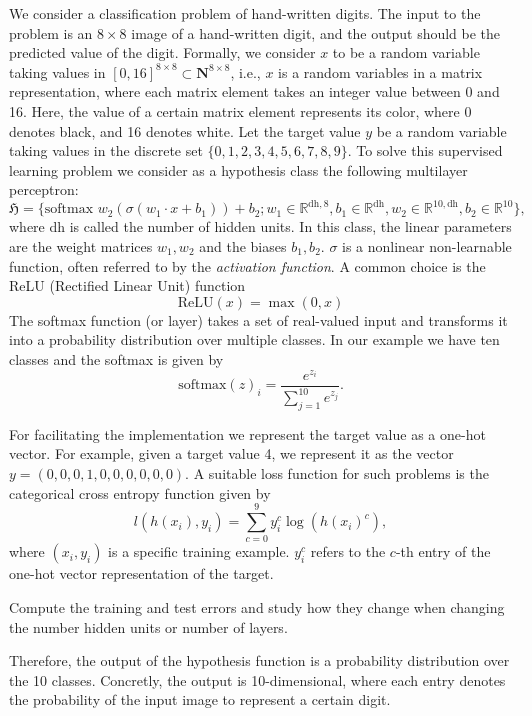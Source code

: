 \begin{boxedexample}[Classification] \complementary{\theexample}
    \label{ex:classification}
    We consider a classification problem of hand-written digits. The input to
    the problem is an $8 \times 8$ image of a hand-written digit, and the output
    should be the predicted value of the digit. Formally, we consider $x$ to be a
    random variable taking values in $[0, 16]^{8 \times 8} \subset
    \mathbf{N}^{8 \times 8}$, i.e., $x$ is a random variables in a matrix
    representation, where each matrix element takes an integer value between 0
    and 16. Here, the value of a certain matrix element represents its color,
    where 0 denotes black, and 16 denotes white. Let the target value $y$ be a
    random variable taking values in the discrete set $\{0,1,2,3,4,5,6,7,8,9\}$.
    To solve this supervised learning problem we consider as a hypothesis class
    the following multilayer perceptron:
    \begin{equation*}
        \mathfrak{H} = \bigl\{\text{softmax } w_2 \left(\sigma (w_1 \cdot x + b_1 ) \right) + b_2 ; w_1 \in \mathbb{R}^{\text{dh}, 8}, b_1 \in \mathbb{R}^{\text{dh}}, w_2 \in \mathbb{R}^{10, \text{dh}}, b_2 \in \mathbb{R}^{10}   \bigr\},
    \end{equation*}
    where dh is called the number of hidden units. In this class, the linear
    parameters are the weight matrices $w_1, w_2$ and the biases $b_1, b_2$.
    $\sigma$ is a nonlinear non-learnable function, often referred to by the \emph{activation function}. A common choice
    is the ReLU (Rectified Linear Unit) function
    \begin{equation*}
        \text{ReLU}(x) = \max(0, x)    
    \end{equation*}
 The softmax function (or layer) takes a set of real-valued input  and
 transforms it into a probability distribution over multiple classes. In our
 example we have ten classes and the softmax is given by
    \begin{equation*}
        \text{softmax}(z)_i = \frac{e^{z_i}}{\sum_{j=1}^{10} e^{z_j}}.
    \end{equation*}

    For facilitating the implementation we represent the target value as a one-hot
    vector. For example, given a target value 4, we represent it as the vector $y =
    (0,0,0,1,0,0,0,0,0,0)$. A suitable loss function for such problems is the
    categorical cross
    entropy
    function given by 
    \begin{equation*}
        l(h(x_i), y_i) = \sum_{c=0}^9 y_{i}^c \log(h(x_i)^c),
    \end{equation*}
    where $(x_i, y_i)$ is a specific training example. $y_{i}^c$ refers to the
    $c$-th entry of the one-hot vector representation of the target.

    Compute the training and test errors and study how they change when changing
    the number hidden units or number of layers.
\end{boxedexample}
Therefore, the output of the hypothesis function is a probability distribution
over the 10 classes. Concretly, the output is 10-dimensional, where each entry
denotes the probability of the input image to represent a certain digit. 
  
